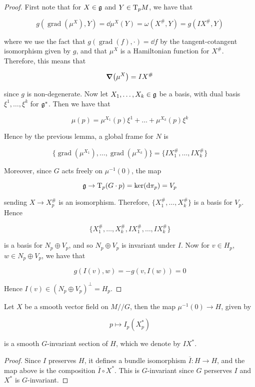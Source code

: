 \documentclass{article}
\newcommand{\sslash}{/\!/}
\DeclareMathOperator{\gr}{grad}
\begin{document}
\begin{proof}
    First note that for \(X \in \mathfrak{g}\) and \(Y \in \mathrm{T}_pM\), we have that

    \[g(\gr(\mu^X), Y) = \dd\mu^X(Y) = \omega(X^\#, Y) = g(IX^\#, Y)\]

    where we use the fact that \(g(\gr(f), \cdot) = \dd f\) by the tangent-cotangent isomorphism given by \(g\), and that \(\mu^X\) is a Hamiltonian function for \(X^\#\). Therefore, this means that

    \[\grad(\mu^X) = IX^\#\]

    since \(g\) is non-degenerate. Now let \(X_1, \dots, X_k \in \mathfrak{g}\) be a basis, with dual basis \(\xi^1, \dots, \xi^k\) for \(\mathfrak{g}^*\). Then we have that

    \[\mu(p) = \mu^{X_1}(p)\xi^1 + \dots + \mu^{X_k}(p)\xi^k\]

    Hence by the previous lemma, a global frame for \(N\) is

    \[\{\gr(\mu^{X_1}), \dots, \gr(\mu^{X_k})\} = \{IX_1^\#, \dots, IX_k^\#\}\]

    Moreover, since \(G\) acts freely on \(\mu^{-1}(0)\), the map

    \[\mathfrak{g} \to \mathrm{T}_p(G \cdot p) = \ker(\dd\pi_p) = V_p\]

    sending \(X \to X^\#_p\) is an isomorphism. Therefore, \(\{X^\#_1, \dots, X^\#_k\}\) is a basis for \(V_p\). Hence

    \[\{X_1^\#, \dots, X_k^\#, IX_1^\#, \dots, IX_k^\#\}\]

    is a basis for \(N_p \oplus V_p\), and so \(N_p \oplus V_p\) is invariant under \(I\). Now for \(v \in H_p\), \(w \in N_p \oplus V_p\), we have that

    \[g(I(v), w) = -g(v, I(w)) = 0\]

    Hence \(I(v) \in (N_p \oplus V_p)^\perp = H_p\).
\end{proof}

\begin{lemma}
    Let \(X\) be a smooth vector field on \(M\sslash G\), then the map \(\mu^{-1}(0) \to H\), given by

    \[p \mapsto I_p(X_p^*)\]

    is a smooth \(G\)-invariant section of \(H\), which we denote by \(IX^*\).
\end{lemma}

\begin{proof}
    Since \(I\) preserves \(H\), it defines a bundle isomorphism \(\overline I : H \to H\), and the map above is the composition \(\overline I \circ X^*\). This is \(G\)-invariant since \(G\) perserves \(I\) and \(X^*\) is \(G\)-invariant.
\end{proof}
\end{document}
